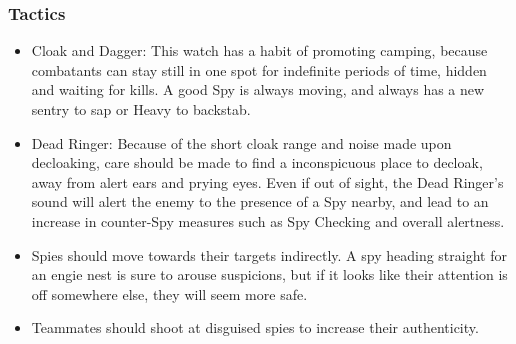 \newpage

\subsubsection{Tactics}
\begin {itemize}
\item Cloak and Dagger:  This watch has a habit of promoting camping, because combatants can stay still in one spot for indefinite periods of time, hidden and waiting for kills.  A good Spy is always moving, and always has a new sentry to sap or Heavy to backstab.

\item Dead Ringer: Because of the short cloak range and noise made upon decloaking, care should be made to find a inconspicuous place to decloak, away from alert ears and prying eyes.  Even if out of sight, the Dead Ringer's sound will alert the enemy to the presence of a Spy nearby, and lead to an increase in counter-Spy measures such as Spy Checking and overall alertness.

\item Spies should move towards their targets indirectly.  A spy heading straight for an engie nest is sure to arouse suspicions, but if it looks like their attention is off somewhere else, they will seem more safe.

\item Teammates should shoot at disguised spies to increase their authenticity.  
\end {itemize}